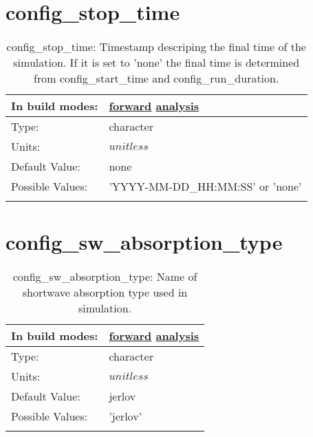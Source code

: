 \section[config\_stop\_time]{config\_stop\_time}
\label{sec:nm_sec_config_stop_time}
\begin{center}
\begin{longtable}{| p{2.0in} || p{4.0in} |}
    \hline
    In build modes: & \hyperref[subsec:forward_nm_tab_time_management]{forward} \hyperref[subsec:analysis_nm_tab_time_management]{analysis} \\
    \hline
    Type: & character \\
    \hline
    Units: & $unitless$ \\
    \hline
    Default Value: & none \\
    \hline
    Possible Values: & 'YYYY-MM-DD\_HH:MM:SS' or 'none' \\
    \hline
    \caption{config\_stop\_time: Timestamp descriping the final time of the simulation. If it is set to 'none' the final time is determined from config\_start\_time and config\_run\_duration.}
\end{longtable}
\end{center}
\section[config\_sw\_absorption\_type]{config\_sw\_absorption\_type}
\label{sec:nm_sec_config_sw_absorption_type}
\begin{center}
\begin{longtable}{| p{2.0in} || p{4.0in} |}
    \hline
    In build modes: & \hyperref[subsec:forward_nm_tab_forcing]{forward} \hyperref[subsec:analysis_nm_tab_forcing]{analysis} \\
    \hline
    Type: & character \\
    \hline
    Units: & $unitless$ \\
    \hline
    Default Value: & jerlov \\
    \hline
    Possible Values: & 'jerlov' \\
    \hline
    \caption{config\_sw\_absorption\_type: Name of shortwave absorption type used in simulation.}
\end{longtable}
\end{center}

